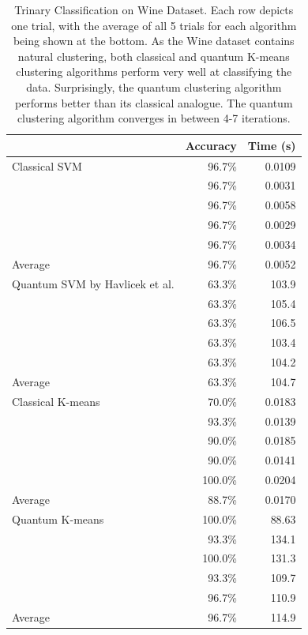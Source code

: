 \documentclass[twocolumn, english]{revtex4-2}
\begin{document}
\begin{table}
\begin{tabular}{l|r|r}
&Accuracy&Time (s)\\
\hline
Classical SVM&96.7\%&0.0109\\
\cline{2-3}
&96.7\%&0.0031\\
\cline{2-3}
&96.7\%&0.0058\\
\cline{2-3}
&96.7\%&0.0029\\
\cline{2-3}
&96.7\%&0.0034\\
\hline\hline
Average&96.7\%&0.0052\\
\hline\hline
Quantum SVM by Havlicek et al.&63.3\%&103.9\\
\cline{2-3}
&63.3\%&105.4\\
\cline{2-3}
&63.3\%&106.5\\
\cline{2-3}
&63.3\%&103.4\\
\cline{2-3}
&63.3\%&104.2\\
\hline\hline
Average&63.3\%&104.7\\
\hline\hline
Classical K-means&70.0\%&0.0183\\
\cline{2-3}
&93.3\%&0.0139\\
\cline{2-3}
&90.0\%&0.0185\\
\cline{2-3}
&90.0\%&0.0141\\
\cline{2-3}
&100.0\%&0.0204\\
\hline\hline
Average&88.7\%&0.0170\\
\hline\hline
Quantum K-means&100.0\%&88.63\\
\cline{2-3}
&93.3\%&134.1\\
\cline{2-3}
&100.0\%&131.3\\
\cline{2-3}
&93.3\%&109.7\\
\cline{2-3}
&96.7\%&110.9\\
\hline\hline
Average&96.7\%&114.9\\
\hline\hline
\end{tabular}
\caption{Trinary Classification on Wine Dataset. Each row depicts one trial, with the average of all 5 trials for each algorithm being shown at the bottom. As the Wine dataset contains natural clustering, both classical and quantum K-means clustering algorithms perform very well at classifying the data. Surprisingly, the quantum clustering algorithm performs better than its classical analogue. The quantum clustering algorithm converges in between 4-7 iterations. }
\end{table}
\end{document}
